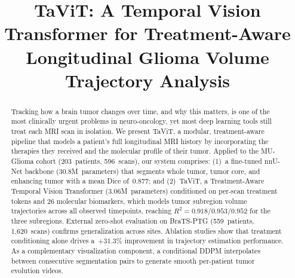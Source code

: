 \documentclass[conference]{IEEEtran}
\begin{document}
%
\title{TaViT: A Temporal Vision Transformer for Treatment-Aware Longitudinal Glioma Volume Trajectory Analysis}


\author{

}


\maketitle

\begin{abstract}
Tracking how a brain tumor changes over time, and why this matters, is one of the most clinically urgent problems in neuro-oncology, yet most deep learning tools still treat each MRI scan in isolation. We present TaViT, a modular, treatment-aware pipeline that models a patient's full longitudinal MRI history by incorporating the therapies they received and the molecular profile of their tumor. Applied to the MU-Glioma cohort (203~patients, 596~scans), our system comprises: (1)~a fine-tuned nnU-Net backbone (30.8M~parameters) that segments whole tumor, tumor core, and enhancing tumor with a mean Dice of~0.877; and (2)~TaViT, a Treatment-Aware Temporal Vision Transformer (3.06M~parameters) conditioned on per-scan treatment tokens and 26 molecular biomarkers, which models tumor subregion volume trajectories across all observed timepoints, reaching $R^2 = 0.918/0.953/0.952$ for the three subregions. External zero-shot evaluation on BraTS-PTG (559~patients, 1,620~scans) confirms generalization across sites. Ablation studies show that treatment conditioning alone drives a~$+31.3\%$ improvement in trajectory estimation performance. As a complementary visualization component, a conditional DDPM interpolates between consecutive segmentation pairs to generate smooth per-patient tumor evolution videos.
\end{abstract}
\end{document}
